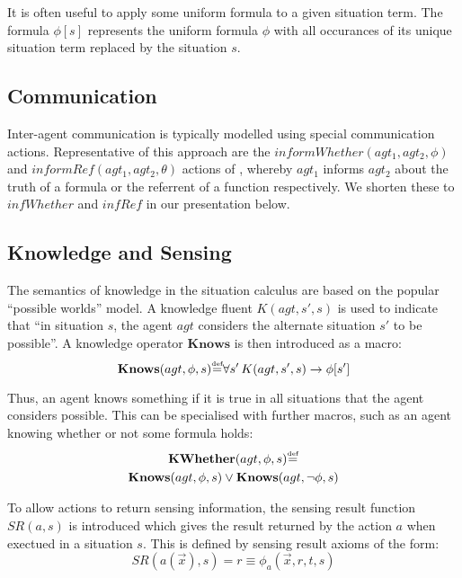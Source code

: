 \documentclass[letterpaper]{article}
\newcommand{\isdef}{\hbox{$\stackrel{\mbox{\tiny def}}{=}$}}
\begin{document}
It is often useful to apply some uniform formula to a given situation
term. The formula $\phi[s]$ represents the uniform formula $\phi$
with all occurances of its unique situation term replaced by the situation
$s$.


\subsection{Communication}

Inter-agent communication is typically modelled using special communication
actions. Representative of this approach are the $informWhether(agt_{1},agt_{2},\phi)$
and $informRef(agt_{1},agt_{2},\theta)$ actions of \cite{shapiro01casl_feat_inter},
whereby $agt_{1}$ informs $agt_{2}$ about the truth of a formula
or the referrent of a function respectively.  We shorten these to $infWhether$
and $infRef$ in our presentation below.


\subsection{Knowledge and Sensing}

The semantics of knowledge in the situation calculus \cite{scherl03sc_knowledge}
are based on the popular {}``possible worlds'' model. A knowledge
fluent $K(agt,s',s)$ is used to indicate that {}``in situation $s$,
the agent $agt$ considers the alternate situation $s'$ to be possible''.
A knowledge operator $\mathbf{Knows}$ is then introduced as a macro:
\begin{equation}
\label{eqn:knows_def}
\mathbf{Knows}(agt,\phi,s)\isdef\forall s'\, K(agt,s',s)\rightarrow\phi[s']
\end{equation}

Thus, an agent knows something if it is true in all situations that
the agent considers possible. This can be specialised with further
macros, such as an agent knowing whether or not some formula holds:
\begin{multline}
\mathbf{KWhether}(agt,\phi,s)\isdef\\
\mathbf{Knows}(agt,\phi,s)\vee\mathbf{Knows}(agt,\neg\phi,s)
\end{multline}

To allow actions to return sensing information, the sensing result
function $SR(a,s)$ is introduced which gives the result returned
by the action $a$ when exectued in a situation $s$. This is defined
by sensing result axioms of the form:
\begin{equation}
SR(a(\overrightarrow{x}),s)=r\equiv\phi_{a}(\overrightarrow{x},r,t,s)
\end{equation}
\end{document}
